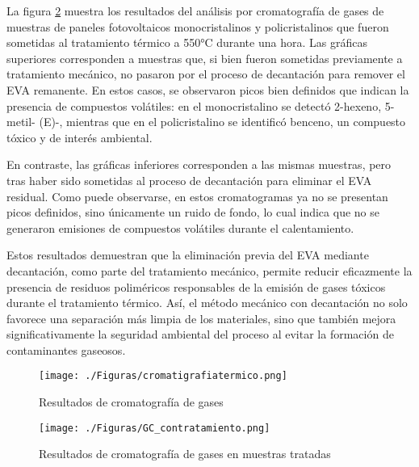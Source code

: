 La figura \ref{fig:cromatratadas} muestra los resultados del análisis por cromatografía de gases de muestras de paneles fotovoltaicos monocristalinos y policristalinos que fueron sometidas al tratamiento térmico a 550°C durante una hora. Las gráficas superiores corresponden a muestras que, si bien fueron sometidas previamente a tratamiento mecánico, no pasaron por el proceso de decantación para remover el EVA remanente. En estos casos, se observaron picos bien definidos que indican la presencia de compuestos volátiles: en el monocristalino se detectó 2-hexeno, 5-metil- (E)-, mientras que en el policristalino se identificó benceno, un compuesto tóxico y de interés ambiental.

En contraste, las gráficas inferiores corresponden a las mismas muestras, pero tras haber sido sometidas al proceso de decantación para eliminar el EVA residual. Como puede observarse, en estos cromatogramas ya no se presentan picos definidos, sino únicamente un ruido de fondo, lo cual indica que no se generaron emisiones de compuestos volátiles durante el calentamiento.

Estos resultados demuestran que la eliminación previa del EVA mediante decantación, como parte del tratamiento mecánico, permite reducir eficazmente la presencia de residuos poliméricos responsables de la emisión de gases tóxicos durante el tratamiento térmico. Así, el método mecánico con decantación no solo favorece una separación más limpia de los materiales, sino que también mejora significativamente la seguridad ambiental del proceso al evitar la formación de contaminantes gaseosos. 

\begin{figure}[htb]
	\begin{center}
		\texttt{[image: ./Figuras/cromatigrafiatermico.png]}
	\end{center}
	\vspace{-1em} %
	\caption{Resultados de cromatografía de gases}
	\label{fig:cromatermico}
\end{figure}

\begin{figure}[htb]
	\begin{center}
		\texttt{[image: ./Figuras/GC\_contratamiento.png]}
	\end{center}
	\vspace{-1em} %
	\caption{Resultados de cromatografía de gases en muestras tratadas}
	\label{fig:cromatratadas}
\end{figure}


